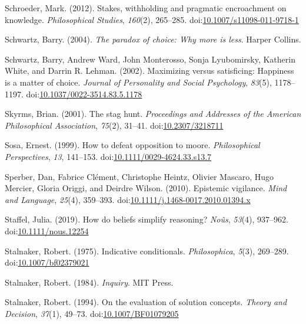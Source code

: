 \documentclass[
  10pt,
  letterpaper,
  twoside]{scrbook}
\newlength{\cslhangindent}
\newenvironment{CSLReferences}[2] %
 {\begin{list}{}{%
  \setlength{\itemindent}{0pt}
  \setlength{\leftmargin}{0pt}
  \setlength{\parsep}{0pt}
  \ifodd #1
   \setlength{\leftmargin}{\cslhangindent}
   \setlength{\itemindent}{-1\cslhangindent}
  \fi
  \setlength{\itemsep}{#2\baselineskip}}}
 {\end{list}}
\begin{document}
\begin{CSLReferences}{1}{0}
Schroeder, Mark. (2012). Stakes, withholding and pragmatic encroachment
on knowledge. \emph{Philosophical Studies}, \emph{160}(2), 265--285.
doi:\href{https://doi.org/10.1007/s11098-011-9718-1}{10.1007/s11098-011-9718-1}

Schwartz, Barry. (2004). \emph{The paradox of choice: Why more is less}.
Harper Collins.

Schwartz, Barry, Andrew Ward, John Monterosso, Sonja Lyubomirsky,
Katherin White, and Darrin R. Lehman. (2002). Maximizing versus
satisficing: Happiness is a matter of choice. \emph{Journal of
Personality and Social Psychology}, \emph{83}(5), 1178--1197.
doi:\href{https://doi.org/10.1037/0022-3514.83.5.1178}{10.1037/0022-3514.83.5.1178}

Skyrms, Brian. (2001). The stag hunt. \emph{Proceedings and Addresses of
the American Philosophical Association}, \emph{75}(2), 31--41.
doi:\href{https://doi.org/10.2307/3218711}{10.2307/3218711}

Sosa, Ernest. (1999). How to defeat opposition to moore.
\emph{Philosophical Perspectives}, \emph{13}, 141--153.
doi:\href{https://doi.org/10.1111/0029-4624.33.s13.7}{10.1111/0029-4624.33.s13.7}

Sperber, Dan, Fabrice Clément, Christophe Heintz, Olivier Mascaro, Hugo
Mercier, Gloria Origgi, and Deirdre Wilson. (2010). Epistemic vigilance.
\emph{Mind and Language}, \emph{25}(4), 359--393.
doi:\href{https://doi.org/10.1111/j.1468-0017.2010.01394.x}{10.1111/j.1468-0017.2010.01394.x}

Staffel, Julia. (2019). How do beliefs simplify reasoning?
\emph{No{û}s}, \emph{53}(4), 937--962.
doi:\href{https://doi.org/10.1111/nous.12254}{10.1111/nous.12254}

Stalnaker, Robert. (1975). Indicative conditionals. \emph{Philosophica},
\emph{5}(3), 269--289.
doi:\href{https://doi.org/10.1007/bf02379021}{10.1007/bf02379021}

Stalnaker, Robert. (1984). \emph{Inquiry}. MIT Press.

Stalnaker, Robert. (1994). On the evaluation of solution concepts.
\emph{Theory and Decision}, \emph{37}(1), 49--73.
doi:\href{https://doi.org/10.1007/BF01079205}{10.1007/BF01079205}


\end{CSLReferences}
\end{document}
